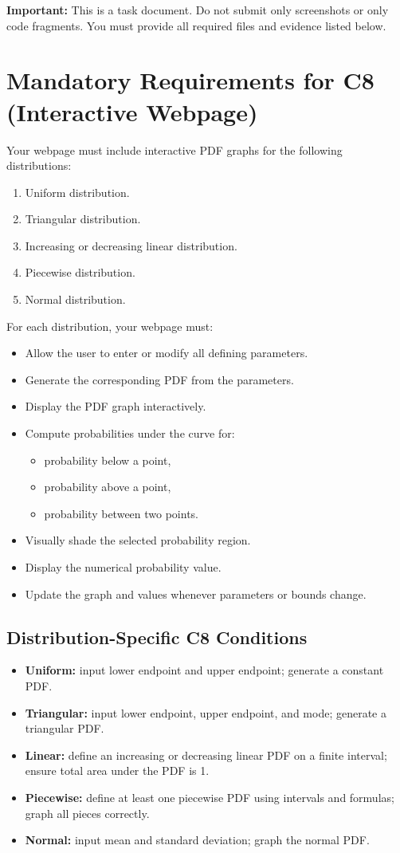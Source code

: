 	\textbf{Important:} This is a task document. Do not submit only screenshots or only code fragments. You must provide all required files and evidence listed below.

	\section{Mandatory Requirements for C8 (Interactive Webpage)}
	Your webpage must include interactive PDF graphs for the following distributions:
	\begin{enumerate}
		\item Uniform distribution.
		\item Triangular distribution.
		\item Increasing or decreasing linear distribution.
		\item Piecewise distribution.
		\item Normal distribution.
	\end{enumerate}
	
	For each distribution, your webpage must:
	\begin{itemize}
		\item Allow the user to enter or modify all defining parameters.
		\item Generate the corresponding PDF from the parameters.
		\item Display the PDF graph interactively.
		\item Compute probabilities under the curve for:
		\begin{itemize}
			\item probability below a point,
			\item probability above a point,
			\item probability between two points.
		\end{itemize}
		\item Visually shade the selected probability region.
		\item Display the numerical probability value.
		\item Update the graph and values whenever parameters or bounds change.
	\end{itemize}

	\subsection*{Distribution-Specific C8 Conditions}
	\begin{itemize}
		\item \textbf{Uniform:} input lower endpoint and upper endpoint; generate a constant PDF.
		\item \textbf{Triangular:} input lower endpoint, upper endpoint, and mode; generate a triangular PDF.
		\item \textbf{Linear:} define an increasing or decreasing linear PDF on a finite interval; ensure total area under the PDF is 1.
		\item \textbf{Piecewise:} define at least one piecewise PDF using intervals and formulas; graph all pieces correctly.
		\item \textbf{Normal:} input mean and standard deviation; graph the normal PDF.
	\end{itemize}

